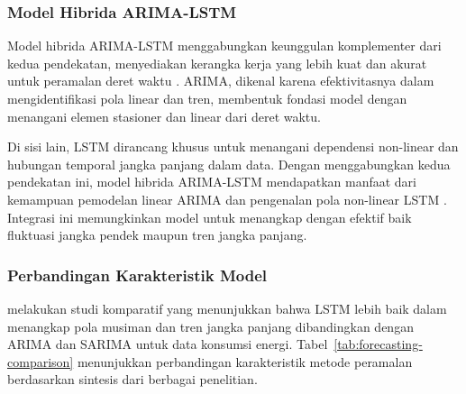 \subsubsection{Model Hibrida ARIMA-LSTM}

Model hibrida ARIMA-LSTM menggabungkan keunggulan komplementer dari kedua pendekatan, menyediakan kerangka kerja yang lebih kuat dan akurat untuk peramalan deret waktu \parencite{alharbi2025prediction}. ARIMA, dikenal karena efektivitasnya dalam mengidentifikasi pola linear dan tren, membentuk fondasi model dengan menangani elemen stasioner dan linear dari deret waktu.

Di sisi lain, LSTM dirancang khusus untuk menangani dependensi non-linear dan hubungan temporal jangka panjang dalam data. Dengan menggabungkan kedua pendekatan ini, model hibrida ARIMA-LSTM mendapatkan manfaat dari kemampuan pemodelan linear ARIMA dan pengenalan pola non-linear LSTM \parencite{alharbi2025prediction}. Integrasi ini memungkinkan model untuk menangkap dengan efektif baik fluktuasi jangka pendek maupun tren jangka panjang.

\subsubsection{Perbandingan Karakteristik Model}

\textcite{dubey2021study} melakukan studi komparatif yang menunjukkan bahwa LSTM lebih baik dalam menangkap pola musiman dan tren jangka panjang dibandingkan dengan ARIMA dan SARIMA untuk data konsumsi energi. Tabel~\ref{tab:forecasting-comparison} menunjukkan perbandingan karakteristik metode peramalan berdasarkan sintesis dari berbagai penelitian.

